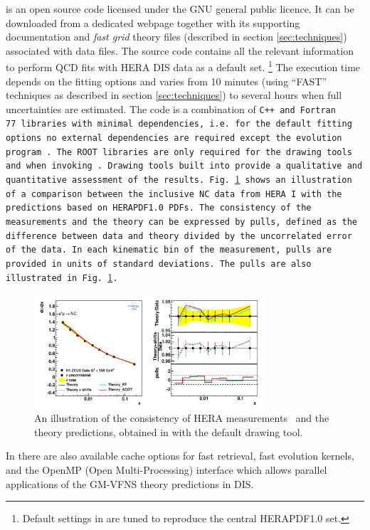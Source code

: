 
\fitter is an open source code licensed under the GNU general public licence. It can be downloaded from a dedicated 
webpage \cite{herafitter:page}
together with its supporting documentation and 
\emph{fast grid} theory files (described in section \ref{sec:techniques}) associated with data files.
The source code contains all the relevant information to perform QCD fits with HERA DIS data as a default 
set. \footnote{Default settings in \fitter are tuned to reproduce the central HERAPDF1.0 set.} 
The execution time depends on the fitting options and varies from 10 minutes 
(using ``FAST'' techniques as described in section \ref{sec:techniques}) to several hours when 
full uncertainties are estimated. The \fitter code is a combination of \tt C++ \rm and \tt Fortran 77\rm \ libraries with minimal 
dependencies, i.e. for the default fitting options no external dependencies are required except the \qcdnum evolution program \cite{qcdnum}.
The \tt ROOT \rm  libraries are only required for the drawing tools and when invoking \applgrid.  
Drawing tools built into \fitter provide a qualitative and quantitative assessment of the results.
Fig.~\ref{fig:data} shows an illustration of a comparison between the inclusive NC data from HERA I
with the predictions based on HERAPDF1.0 PDFs.
The consistency of the measurements and the theory can be expressed by pulls, defined as the difference between data and theory divided by the uncorrelated error of the data. 
In each kinematic bin of the measurement, pulls are provided in units of standard deviations.  
The pulls are also illustrated in Fig.~\ref{fig:data}.
\begin{figure}[!ht]
   \centering
   \includegraphics[width=8.6cm]{datatheory.pdf}
   \caption{An illustration of the consistency of HERA measurements~\cite{h1zeus:2009wt} and the theory predictions, 
       obtained in \fitter with the default drawing tool.} 
 \label{fig:data}
\end{figure}


In \fitter there are also available cache options for fast retrieval, fast evolution kernels, and the OpenMP (Open Multi-Processing) 
interface which allows parallel applications of the GM-VFNS theory predictions in DIS. 


